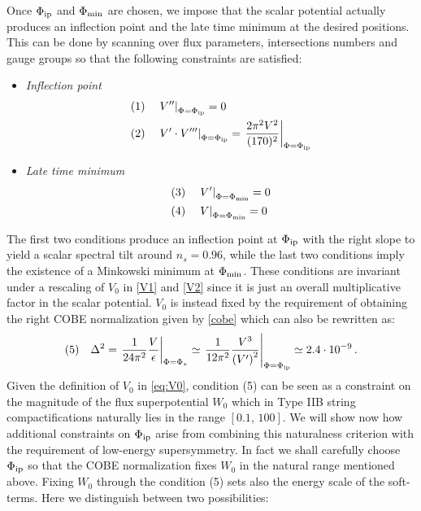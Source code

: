 \documentclass[12pt,a4paper]{book}
\newcommand{\bi}{\begin{itemize}}
\newcommand{\ei}{\end{itemize}}
\begin{document}
Once $\Phi_{\rm ip}$ and $\Phi_{\rm min}$ are chosen, we impose that the scalar potential actually produces an inflection point and the late time minimum at the desired positions. This can be done by scanning over flux parameters, intersections numbers and gauge groups so that the following constraints are satisfied:
\bi
\item \textit{Inflection point}
\begin{align}
&(1)\quad\left.V''\right|_{\Phi = \Phi_{\rm ip}} = 0 \label{eq:cond1}\\
&(2)\quad\left. V' \cdot V'''\right|_{\Phi = \Phi_{\rm ip}} = \left.\frac{2 \pi^2 V^2}{(170)^2}\right|_{\Phi = \Phi_{\rm ip}}\label{eq:cond2}
\end{align}
\item \textit{Late time minimum}
\begin{align} 
&(3) \quad \left.V'\right|_{\Phi = \Phi_{\rm min}} = 0 \label{eq:cond3}\\
&(4) \quad \left.V\right|_{\Phi = \Phi_{\rm min}} = 0 \label{eq:cond4}
\end{align}
\ei
The first two conditions produce an inflection point at $\Phi_{\rm ip}$ with the right slope to yield a scalar spectral tilt around $n_s = 0.96$, while the last two conditions imply the existence of a Minkowski minimum at $\Phi_{\rm min}$. These conditions are invariant under a rescaling of $V_0$ in \eqref{V1} and \eqref{V2} since it is just an overall multiplicative factor in the scalar potential. $V_0$ is instead fixed by the requirement of obtaining the right COBE normalization given by \eqref{cobe} which can also be rewritten as:
\begin{align}
(5) \quad \Delta^2 = \left.\frac{1}{24 \pi^2} \frac{V}{\epsilon}\right|_{\Phi = \Phi_*} \simeq \left.\frac{1}{12 \pi^2} \frac{V^3}{\left(V'\right)^2}\right|_{\Phi = \Phi_{\rm ip}} \simeq 2.4 \cdot 10^{-9}\,.
\end{align}
Given the definition of $V_0$ in \eqref{eq:V0}, condition (5) can be seen as a constraint on the magnitude of the flux superpotential $W_0$ which in Type IIB string compactifications naturally lies in the range $[0.1,\,100]$. We will show now how additional constraints on $\Phi_{\rm ip}$ arise from combining this naturalness criterion with the requirement of low-energy supersymmetry. In fact we shall carefully choose $\Phi_{\rm ip}$ so that the COBE normalization fixes $W_0$ in the natural range mentioned above. Fixing $W_0$ through the condition (5) sets also the energy scale of the soft-terms. Here we distinguish between two possibilities:
\end{document}
